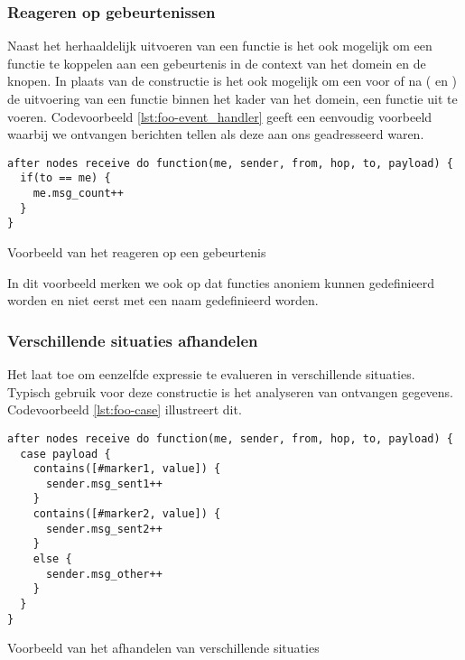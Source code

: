 \subsubsection{Reageren op gebeurtenissen}

Naast het herhaaldelijk uitvoeren van een functie is het ook mogelijk om een
functie te koppelen aan een gebeurtenis in de context van het domein en de
knopen. In plaats van de  constructie is het ook mogelijk om
een voor of na ( en ) de uitvoering van een functie
binnen het kader van het domein, een functie uit te voeren. Codevoorbeeld
\ref{lst:foo-event_handler} geeft een eenvoudig voorbeeld waarbij we ontvangen
berichten tellen als deze aan ons geadresseerd waren.

\begin{listing}[ht]
  \begin{verbatim}
after nodes receive do function(me, sender, from, hop, to, payload) {
  if(to == me) {
    me.msg_count++
  }
}
  \end{verbatim}
  \vspace{-5mm}
  \caption{Voorbeeld van het reageren op een gebeurtenis}
  \label{lst:foo-event_handler}
\end{listing}

In dit voorbeeld merken we ook op dat functies anoniem kunnen gedefinieerd
worden en niet eerst met een naam gedefinieerd worden.

\subsubsection{Verschillende situaties afhandelen}

Het  laat toe om eenzelfde expressie te evalueren in
verschillende situaties. Typisch gebruik voor deze constructie is het
analyseren van ontvangen gegevens. Codevoorbeeld \ref{lst:foo-case} illustreert dit.

\begin{listing}[ht]
  \begin{verbatim}
after nodes receive do function(me, sender, from, hop, to, payload) {
  case payload {
    contains([#marker1, value]) {
      sender.msg_sent1++
    }
    contains([#marker2, value]) {
      sender.msg_sent2++
    }
    else {
      sender.msg_other++
    }
  }
}
  \end{verbatim}
  \vspace{-5mm}
  \caption{Voorbeeld van het afhandelen van verschillende situaties}
  \label{lst:foo-case}
\end{listing}

